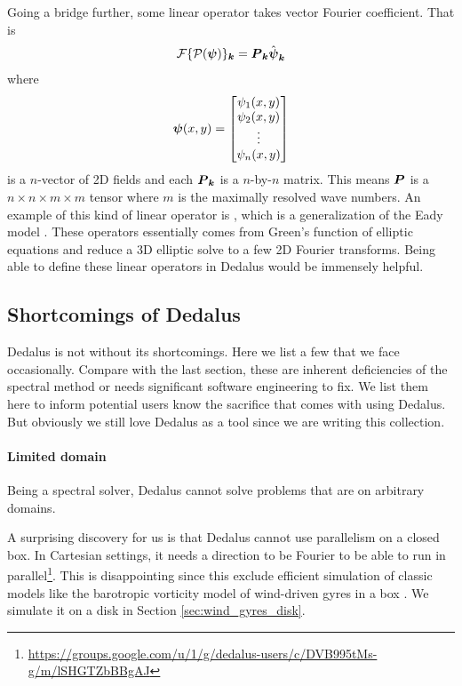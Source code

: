Going a bridge further, some linear operator takes vector Fourier coefficient. That is
\begin{align}
    \mathcal{F}\{\mathcal{P}(\boldsymbol{\psi})\}_{\boldsymbol{k}} = \boldsymbol{P}_{\boldsymbol{k}}\hat{\boldsymbol{\psi}}_{\boldsymbol{k}}
\end{align}
where 
\begin{align}
    \boldsymbol{\psi}(x,y) = \begin{bmatrix}
        \psi_1(x,y)\\
        \psi_2(x,y)\\
        \vdots\\
        \psi_n(x,y)
    \end{bmatrix}
\end{align}
is a $n$-vector of 2D fields and each $\boldsymbol{P}_{\boldsymbol{k}}$ is a $n$-by-$n$ matrix. This means $\boldsymbol{P}$ is a $n\times n\times m\times m$ tensor where $m$ is the maximally resolved wave numbers. An example of this kind of linear operator is \cite{CalliesEtAl_16}, which is a generalization of the Eady model \parencite{Eady_49, TullochSmith_09}. These operators essentially comes from Green's function of elliptic equations and reduce a 3D elliptic solve to a few 2D Fourier transforms. Being able to define these linear operators in Dedalus would be immensely helpful. 

\subsection{Shortcomings of Dedalus}
Dedalus is not without its shortcomings. Here we list a few that we face occasionally. Compare with the last section, these are inherent deficiencies of the spectral method or needs significant software engineering to fix. We list them here to inform potential users know the sacrifice that comes with using Dedalus. But obviously we still love Dedalus as a tool since we are writing this collection.

\paragraph{Limited domain}
Being a spectral solver, Dedalus cannot solve problems that are on arbitrary domains. 

A surprising discovery for us is that Dedalus cannot use parallelism on a closed box. In Cartesian settings, it needs a direction to be Fourier to be able to run in parallel\footnote{\url{https://groups.google.com/u/1/g/dedalus-users/c/DVB995tMs-g/m/lSHGTZbBBgAJ}}. This is disappointing since this exclude efficient simulation of classic models like the barotropic vorticity model of wind-driven gyres in a box \parencite[\S 19.4]{Vallis_17}. We simulate it on a disk in Section \ref{sec:wind_gyres_disk}.


